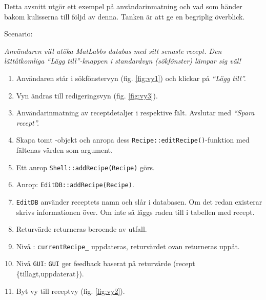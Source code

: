 Detta avsnitt utgör ett exempel på användarinmatning och vad som händer bakom kulisserna till följd av denna. Tanken är att ge en begriplig överblick.

Scenario:

\emph{Användaren vill utöka MatLabbs databas med sitt senaste recept. Den lättåtkomliga ``Lägg till''-knappen i standardvyn (sökfönster) lämpar sig väl!}

\begin{enumerate}
  \item Användaren står i sökfönstervyn (fig. \ref{fig:vy1}) och klickar på \emph{``Lägg till''.}
  \item Vyn ändras till redigeringsvyn (fig. \ref{fig:vy3}). 
  \item Användarinmatning av receptdetaljer i respektive fält. Avslutar med \emph{``Spara recept''.}
  \item Skapa tomt \Recipe-objekt och anropa dess \verb=Recipe::editRecipe()=-funktion med fältenas värden som argument.
  \item Ett anrop \verb=Shell::addRecipe(Recipe)= görs.
  \item Anrop: \verb=EditDB::addRecipe(Recipe)=.
  \item \verb=EditDB= använder receptets namn och slår i databasen. Om det redan existerar skrivs informationen över. Om inte så läggs raden till i tabellen med recept.
  \item Returvärde returneras beroende av utfall.
  \item Nivå \Shell: \verb=currentRecipe_= uppdateras, returvärdet ovan returneras uppåt.
  \item Nivå \verb=GUI=: \verb=GUI= ger feedback baserat på returvärde (recept \{tillagt,uppdaterat\}).
\item Byt vy till receptvy (fig. \ref{fig:vy2}).
\end{enumerate}


